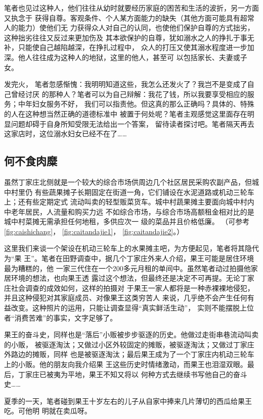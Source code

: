 笔者也见过这种人，他们往往从幼时就要经历家庭的困苦和生活的波折，另一方面又执念于
获得自尊。客观条件、个人某方面能力的缺失（其他方面可能具有超常人的能力）使他们无
力获得众人对自己的认同，也使他们保护自尊的方式拙劣，这种拙劣往往又反过来更加伤及
其本欲保护的自尊，犹如溺水之人的挣扎于事无补，只能使自己越陷越深，在挣扎过程中，
众人的打压又使其溺水程度进一步加深。他人往往成为这种人的地狱，这里的他人，甚至可
以包括家长、夫妻或子女。

发完火， 笔者忽感惭愧：我明明知道这些，我怎么还发火了？我岂不是变成了自己曾经讨厌
的那种人？笔者可以为自己辩解：我花了钱，所以我要享受相应的服务；中年妇女服务不好，
我们可以指责他。但这真的那么正确吗？具体的、特殊的人在这种想当然正确的道德标准中
被置于何处呢？笔者主观感觉这里面存在明显问题却碍于自身所知受限无法给出一个答案，
留待读者探讨吧。笔者隔天再去这家店时，这位溺水妇女已经不在了……

\subsection{何不食肉糜}

虽然丁家庄北侧就是一个较大的综合市场供周边几个社区居民采购农副产品，但城中村里仍
有些蔬果摊子长期固定在街道一角，它们铺设在水泥道路或机动三轮车上；还有些定期定式
流动叫卖的轻型贩菜货车。城中村蔬果摊主要面向城中村内中老年居民，人流量和购买力远
不如综合市场，与综合市场高额租金相对比的是城中村菜摊无需承担任何地租，多供应次一
级的菜品并且价格低廉。 （可参考\cref{fig:caishichang}， \cref{fig:caitandajie1}，
  \cref{fig:caitandajie2}。）

这里我们来谈一个架设在机动三轮车上的水果摊主吧，为方便起见，笔者将其隐代为“果
王”。笔者在田野调查中，据几个丁家庄外来人介绍，果王可能是居住环境最为糟糕的，他
一家三代住在一个200多元月租的单间中。虽然笔者动过拍摄他家居环境的想法，也向果王透
露过这个想法，但最终还是决定不可再提。无论丁家庄社会调查的成效如何，这样的拍摄对
于果王一家人都将是一种赤裸裸地侵犯，并且这种侵犯对其家庭成员、对像果王这类穷苦人
来说，几乎绝不会产生任何有益改变。这种照片的运用，只能让调查显得“真实鲜活生动”，
实则不能摆脱上位者“消费苦难”的事实，文字足够了。

果王的奋斗史，同样也是“落后”小贩被步步驱逐的历史。他做过走街串巷流动叫卖的小贩，
被驱逐淘汰；又做过小区外较固定的摊贩，被驱逐淘汰；又做过丁家庄外路边的摊贩，同样
也是被驱逐淘汰；最后果王成为了一个丁家庄内机动三轮车上的小贩。他的朋友向我介绍果
王这些历史时情绪激动，而果王也泪湿双眼。最后，丁家庄已被夷为平地，果王不知又将以
何种方式去继续书写他自己的奋斗史……

夏季的一天，笔者碰到果王十岁左右的儿子从自家中捧来几片薄切的西瓜给果王吃。可他明
明就在卖瓜呀。

